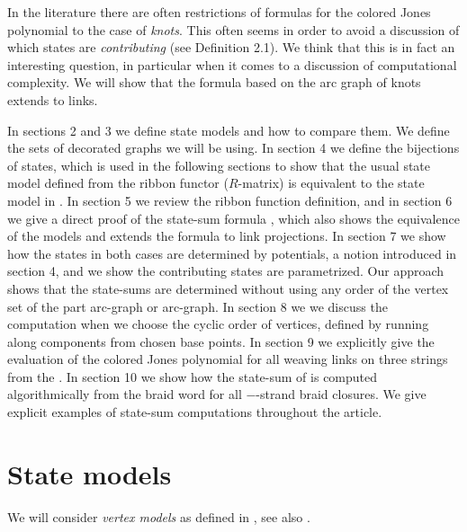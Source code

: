 \documentclass[11pt]{article}
\theoremstyle{definition}
\theoremstyle{remark}
\theoremstyle{remark}
\begin{document}
In the literature there are often restrictions of formulas for the colored Jones polynomial to the case of \textit{knots}. This often seems in order to avoid a discussion of which states are \textit{contributing} (see Definition 2.1). We think that this is in fact an interesting question, in particular when it comes to a discussion of computational complexity. 
We will show that the formula \cite{GL} based on the arc graph of knots extends to links. 

In sections 2 and 3 we define state models and how to compare them.  We define the sets of decorated graphs we will be using. In section 4 we define the bijections of states, which is used in the following sections to show that the usual state model defined from the ribbon functor ($R$-matrix) is equivalent to the state model in \cite{GL}. In section 5 we review the ribbon function definition, and in section 6 we give a direct proof of the state-sum formula \cite{GL}, which also shows the equivalence of the models and extends the formula to link projections. In section 7 we show how the states in both cases are determined by potentials, a notion introduced in section 4, and we show the contributing states are parametrized. Our approach shows that the state-sums are determined without using any order of the vertex set of the part arc-graph or arc-graph. In section 8 we we discuss the computation when we choose the cyclic order of vertices, defined by running along components from chosen base points. In section 9 we explicitly give the evaluation of the colored Jones polynomial for all weaving links on three strings from the \cite{GL}. In section 10 we show how the state-sum of 
is computed algorithmically from the braid word for all $-$-strand braid closures. We give explicit examples of state-sum computations throughout the article. 

\vskip 0.1in

\section{State models}

We will consider \textit{vertex models} as defined in \cite{J}, see also \cite{T}.
\end{document}

